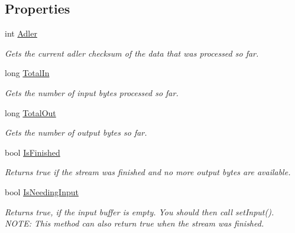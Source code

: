 \subsection*{Properties}
\begin{DoxyCompactItemize}
\item 
int \hyperlink{class_i_c_sharp_code_1_1_sharp_zip_lib_1_1_zip_1_1_compression_1_1_deflater_a074fbfc52ac8f635b64b2c58cd2b3f95}{Adler}
\begin{DoxyCompactList}\small\item\em Gets the current adler checksum of the data that was processed so far. \end{DoxyCompactList}\item 
long \hyperlink{class_i_c_sharp_code_1_1_sharp_zip_lib_1_1_zip_1_1_compression_1_1_deflater_a4693c429dd0f79c65497f95649da225e}{Total\+In}
\begin{DoxyCompactList}\small\item\em Gets the number of input bytes processed so far. \end{DoxyCompactList}\item 
long \hyperlink{class_i_c_sharp_code_1_1_sharp_zip_lib_1_1_zip_1_1_compression_1_1_deflater_a5cd8c55b5c101ba971532affb54f88af}{Total\+Out}
\begin{DoxyCompactList}\small\item\em Gets the number of output bytes so far. \end{DoxyCompactList}\item 
bool \hyperlink{class_i_c_sharp_code_1_1_sharp_zip_lib_1_1_zip_1_1_compression_1_1_deflater_aabbabbf940655a8832a8ed57d8804fa7}{Is\+Finished}
\begin{DoxyCompactList}\small\item\em Returns true if the stream was finished and no more output bytes are available. \end{DoxyCompactList}\item 
bool \hyperlink{class_i_c_sharp_code_1_1_sharp_zip_lib_1_1_zip_1_1_compression_1_1_deflater_aab8aa7baaad840eb260ff1e0385fe116}{Is\+Needing\+Input}
\begin{DoxyCompactList}\small\item\em Returns true, if the input buffer is empty. You should then call set\+Input(). N\+O\+TE\+: This method can also return true when the stream was finished. \end{DoxyCompactList}\end{DoxyCompactItemize}


